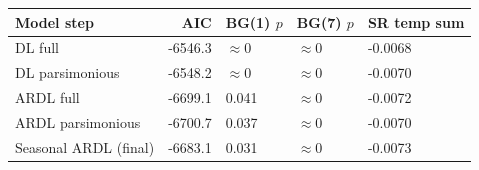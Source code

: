 
\begin{tabular}{lrlll}
\toprule
Model step & AIC & BG(1) $p$ & BG(7) $p$ & SR temp sum\\
\midrule
DL full & -6546.3 & $\approx 0$ & $\approx 0$ & -0.0068\\
DL parsimonious & -6548.2 & $\approx 0$ & $\approx 0$ & -0.0070\\
ARDL full & -6699.1 & 0.041 & $\approx 0$ & -0.0072\\
ARDL parsimonious & -6700.7 & 0.037 & $\approx 0$ & -0.0070\\
Seasonal ARDL (final) & -6683.1 & 0.031 & $\approx 0$ & -0.0073\\
\bottomrule
\end{tabular}
